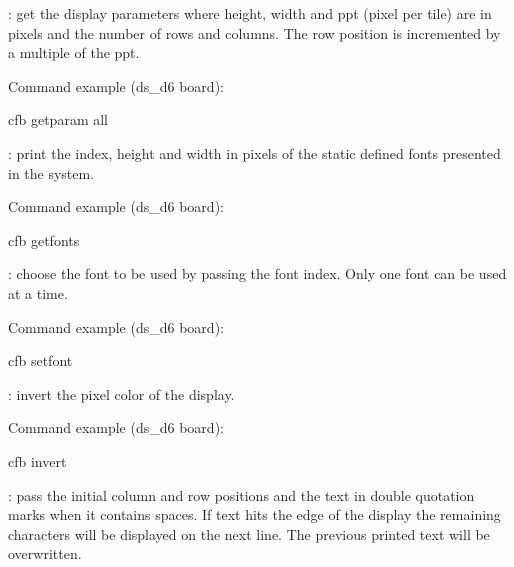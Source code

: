 \documentclass[letterpaper,10pt,english]{sphinxmanual}
\begin{document}
: get the display parameters where height, width and ppt
(pixel per tile) are in pixels and the number of rows and columns. The row
position is incremented by a multiple of the ppt.

Command example (ds\_d6 board):

\begin{sphinxVerbatim}[commandchars=\\\{\}]
 cfb get\PYGZus{}param all
\end{sphinxVerbatim}

: print the index, height and width in pixels of the static
defined fonts presented in the system.

Command example (ds\_d6 board):

\begin{sphinxVerbatim}[commandchars=\\\{\}]
 cfb get\PYGZus{}fonts
\end{sphinxVerbatim}

: choose the font to be used by passing the font index. Only one
font can be used at a time.

Command example (ds\_d6 board):

\begin{sphinxVerbatim}[commandchars=\\\{\}]
 cfb set\PYGZus{}font 
\end{sphinxVerbatim}

: invert the pixel color of the display.

Command example (ds\_d6 board):

\begin{sphinxVerbatim}[commandchars=\\\{\}]
 cfb invert
\end{sphinxVerbatim}

: pass the initial column and row positions and the text in
double quotation marks when it contains spaces. If text hits the edge
of the display the remaining characters will be displayed on the next line. The
previous printed text will be overwritten.
\end{document}
